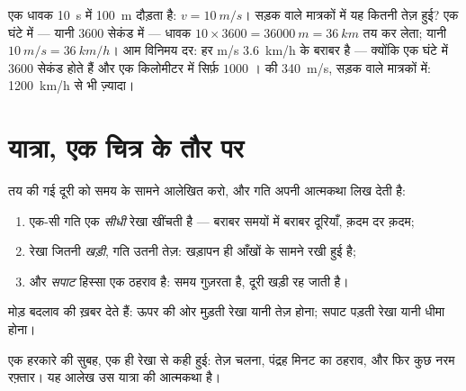 \begin{example}[दो मात्रक, एक ही चाल]\label{ex:g7:motion-average-speed:units}
एक धावक \qty{10}{s} में \qty{100}{m} दौड़ता है: $v = \qty{10}{m/s}$।
सड़क वाले मात्रकों में यह कितनी तेज़ हुई? एक घंटे में --- यानी $3600$
सेकंड में --- धावक $10 \times 3600 = \qty{36000}{m} = \qty{36}{km}$
तय कर लेता; यानी $\qty{10}{m/s} = \qty{36}{km/h}$। आम विनिमय दर: हर
\unit{m/s} \qty{3.6}{km/h} के बराबर है --- क्योंकि एक घंटे में $3600$
सेकंड होते हैं और एक किलोमीटर में सिर्फ़ $1000$ ।  की
\qty{340}{m/s}, सड़क वाले मात्रकों में: \qty{1200}{km/h} से भी
ज़्यादा।
\end{example}

\section{यात्रा, एक चित्र के तौर पर}

\begin{proposition}[आलेख के नियम]\label{prop:g7:motion-average-speed:graphs}
तय की गई दूरी को समय के सामने आलेखित करो, और गति अपनी आत्मकथा लिख
देती है:
\begin{enumerate}
  \item एक-सी गति एक \emph{सीधी} रेखा खींचती है --- बराबर समयों में
        बराबर दूरियाँ, क़दम दर क़दम;
  \item रेखा जितनी \emph{खड़ी}, गति उतनी तेज़: खड़ापन ही आँखों के
        सामने रखी हुई  है;
  \item और \emph{सपाट} हिस्सा एक ठहराव है: समय गुज़रता है, दूरी खड़ी
        रह जाती है।
\end{enumerate}
मोड़ बदलाव की ख़बर देते हैं: ऊपर की ओर मुड़ती रेखा यानी तेज़ होना;
सपाट पड़ती रेखा यानी धीमा होना।
\end{proposition}

\begin{omfigure}

{\small एक हरकारे की सुबह, एक ही रेखा से कही हुई: तेज़ चलना, पंद्रह
मिनट का ठहराव, और फिर कुछ नरम रफ़्तार। यह आलेख उस यात्रा की आत्मकथा
है।}
\end{omfigure}

